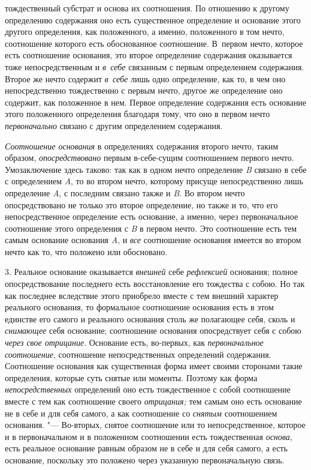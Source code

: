 тождественный субстрат и основа их соотношения. По отношению к другому
определению содержания оно есть существенное определение и основание этого
другого определения, как положенного, а именно, положенного в том нечто,
соотношение которого есть обоснованное соотношение. В~первом нечто, которое
есть соотношение основания, это второе определение содержания оказывается
тоже непосредственным и {\em в~себе} связанным с первым
определением содержания. Второе же нечто содержит
{\em в~себе} лишь одно определение, как то, в чем оно
непосредственно тождественно с первым нечто, другое же определение оно
содержит, как положенное в нем. Первое определение содержания есть
основание этого положенного определения благодаря тому, что оно в первом
нечто {\em первоначально} связано с другим определением
содержания.

{\em Соотношение основания} в определениях содержания
второго нечто, таким образом, {\em опосредствовано}
первым в-себе-сущим соотношением первого нечто. Умозаключение здесь таково:
так как в одном нечто определение {\em B} связано в
себе с определением {\em A}, то во втором нечто,
которому присуще непосредственно лишь определение
{\em A}, с последним связано также и
{\em B}. Во втором нечто опосредствовано не только это
второе определение, но также и то, что его непосредственное определение
есть основание, а именно, через первоначальное соотношение этого
определения с {\em B} в первом нечто. Это соотношение
есть тем самым основание основания {\em A}, и
{\em все} соотношение основания имеется во втором нечто
как то, что положено или обосновано.

3. Реальное основание оказывается {\em внешней} себе
{\em рефлексией} основания; полное опосредствование
последнего есть восстановление его тождества с собою. Но так как последнее
вследствие этого приобрело вместе с тем внешний характер реального
основания, то формальное соотношение основания есть в этом единстве его
самого и реального основания столь же полагающее себя, сколь и
{\em снимающее} себя основание; соотношение основания
опосредствует себя с собою {\em через свое отрицание}.
Основание есть, во-первых, как {\em первоначальное
}{\em соотношение}, соотношение непосредственных
определений содержания. Соотношение основания как существенная форма имеет
своими сторонами такие определения, которые суть снятые или моменты.
Поэтому как форма {\em непосредственных} определений
оно есть тождественное с собой соотношение вместе с тем как соотношение
своего {\em отрицания;} тем самым оно есть основание не
в себе и для себя самого, а как соотношение со
{\em снятым} соотношением основания. "--- Во-вторых,
снятое соотношение или то непосредственное, которое и в первоначальном и в
положенном соотношении есть тождественная {\em основа},
есть реальное основание равным образом не в себе и для себя самого, а есть
основание, поскольку это положено через указанную первоначальную связь.

